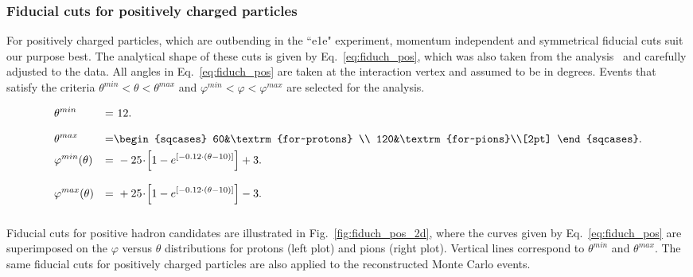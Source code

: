 \clearpage
\subsubsection{Fiducial cuts for positively charged particles}
\label{Sect:fiduc_pos}

For positively charged particles, which are outbending in the ``e1e" experiment, momentum independent and symmetrical fiducial cuts suit our purpose best. The analytical shape of these cuts is given by Eq.~\eqref{eq:fiduch_pos}, which was also taken from the analysis~\cite{Fed_an_note:2017} and carefully adjusted to the data. All angles in Eq.~\eqref{eq:fiduch_pos} are taken at the interaction vertex and assumed to be in degrees. Events that satisfy the criteria $\theta^{min} < \theta < \theta^{max}$ and $\varphi^{min} < \varphi < \varphi^{max}$ are selected for the analysis. 

\begin{equation}
\begin{aligned}
&  \theta^{min} & = &~12.\\[8pt]
&  \theta^{max} & = &  \begin{sqcases} 
60&\textrm{for~protons} \\ 
120&\textrm{for~pions}\\[2pt]
\end{sqcases}. \\
& \varphi^{min}(\theta)  & = &~-25\!\cdot\! \left [1-e^{\left [-0.12\cdot (\theta-10)\right ]}\right ]+3.  \\[8pt]
& \varphi^{max}(\theta)  & = &~+25\!\cdot\! \left [1-e^{\left [-0.12\cdot (\theta-10)\right ]}\right ]-3. \\[8pt]
\end{aligned} \label{eq:fiduch_pos} 
\end{equation}

Fiducial cuts for positive hadron candidates are illustrated in Fig.~\ref{fig:fiduch_pos_2d}, where the curves given by Eq.~\eqref{eq:fiduch_pos} are superimposed on the $\varphi$ versus $\theta$ distributions for protons (left plot) and pions (right plot). Vertical lines correspond to $\theta^{min}$ and $\theta^{max}$. The same fiducial cuts for positively charged particles are also applied to the reconstructed Monte Carlo events.


